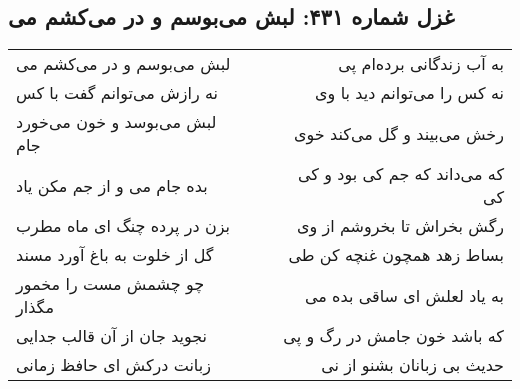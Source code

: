 \begin{center}
\section*{غزل شماره ۴۳۱: لبش می‌بوسم و در می‌کشم می}
\label{sec:sh431}
\begin{longtable}{l p{0.5cm} r}
لبش می‌بوسم و در می‌کشم می
&&
به آب زندگانی برده‌ام پی
\\
نه رازش می‌توانم گفت با کس
&&
نه کس را می‌توانم دید با وی
\\
لبش می‌بوسد و خون می‌خورد جام
&&
رخش می‌بیند و گل می‌کند خوی
\\
بده جام می و از جم مکن یاد
&&
که می‌داند که جم کی بود و کی کی
\\
بزن در پرده چنگ ای ماه مطرب
&&
رگش بخراش تا بخروشم از وی
\\
گل از خلوت به باغ آورد مسند
&&
بساط زهد همچون غنچه کن طی
\\
چو چشمش مست را مخمور مگذار
&&
به یاد لعلش ای ساقی بده می
\\
نجوید جان از آن قالب جدایی
&&
که باشد خون جامش در رگ و پی
\\
زبانت درکش ای حافظ زمانی
&&
حدیث بی زبانان بشنو از نی
\\
\end{longtable}
\end{center}
